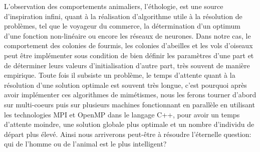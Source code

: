 \documentclass[12pt]{article}
\begin{document}
L'observation des comportements animaliers, l'éthologie, est une source d'inspiration infini, quant à la réalisation d'algorithme utile à la résolution de problèmes, tel que le voyageur du commerce, la détermination d'un optimum d'une fonction non-linéaire ou encore les réseaux de neurones. Dans notre cas, le comportement des colonies de fourmis, les colonies d'abeilles et les vols d'oiseaux peut être implémenter sous condition de bien définir les paramètres d'une part et de déterminer leurs valeurs d'initialisation d'autre part, très souvent de manière empirique. Toute fois il subsiste un problème, le temps d'attente quant à la résolution d'une solution optimale est souvent très longue, c'est pourquoi après avoir implémenter ces algorithmes de mimétismes, nous les ferons tourner d'abord sur multi-coeurs puis sur plusieurs machines fonctionnant en parallèle en utilisant les technologies MPI et OpenMP dans le langage C++, pour avoir un temps d'attente moindre, une solution globale plus optimale et un nombre d'individu de départ plus élevé. Ainsi nous arriverons peut-être à résoudre l'éternelle question: qui de l'homme ou de l'animal est le plus intelligent? 



\nocite{*}


\end{document}
